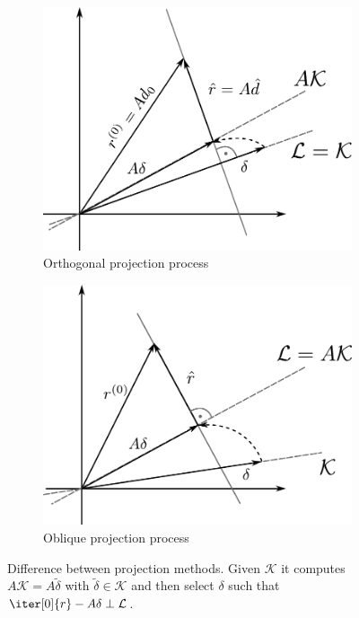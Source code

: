 \begin{figure}
\centering
\begin{subfigure}{.5\textwidth}
  \centering
  \includegraphics[width=\linewidth]{chapters/2_solvers/2_3_iterative_solvers/figures/projection_orthogonal.pdf}
  \caption{Orthogonal projection process}
  \label{fig:projection_orthogonal}
\end{subfigure}%
\begin{subfigure}{.5\textwidth}
  \centering
  \includegraphics[width=\linewidth]{chapters/2_solvers/2_3_iterative_solvers/figures/projection_oblique.pdf}
  \caption{Oblique projection process}
  \label{fig:projection_oblique}
\end{subfigure}
\caption{Difference between projection methods. Given $\mathcal{K}$ it computes $A\mathcal{K} =A\tilde{\delta}$ with $\tilde{\delta} \in \mathcal{K}$ and then select $\delta$ such that $\iter[0]{r}-A\delta \perp \mathcal{L}$.}
\label{fig:projection}
\end{figure}

